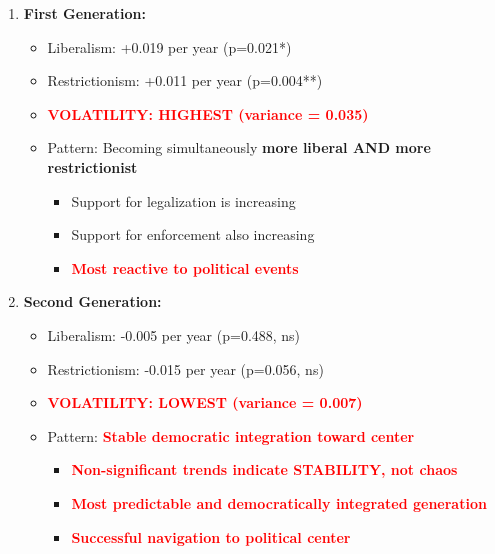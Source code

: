 \documentclass[11pt,letterpaper]{article}
\begin{document}
\begin{enumerate}
    \item \textbf{First Generation:}
        \begin{itemize}
            \item Liberalism: +0.019 per year (p=0.021*)
            \item Restrictionism: +0.011 per year (p=0.004**)
            \item \textcolor{red}{\textbf{VOLATILITY: HIGHEST (variance = 0.035)}}
            \item Pattern: Becoming simultaneously \textbf{more liberal AND more restrictionist}
                \begin{itemize}
                    \item Support for legalization is increasing
                    \item Support for enforcement also increasing
                    \item \textcolor{red}{\textbf{Most reactive to political events}}
                \end{itemize}
        \end{itemize}

    \item \textbf{Second Generation:}
        \begin{itemize}
            \item Liberalism: -0.005 per year (p=0.488, ns)
            \item Restrictionism: -0.015 per year (p=0.056, ns)
            \item \textcolor{red}{\textbf{VOLATILITY: LOWEST (variance = 0.007)}}
            \item Pattern: \textbf{\textcolor{red}{Stable democratic integration toward center}}
                \begin{itemize}
                    \item \textcolor{red}{\textbf{Non-significant trends indicate STABILITY, not chaos}}
                    \item \textcolor{red}{\textbf{Most predictable and democratically integrated generation}}
                    \item \textcolor{red}{\textbf{Successful navigation to political center}}
                \end{itemize}
        \end{itemize}


\end{enumerate}
\end{document}
